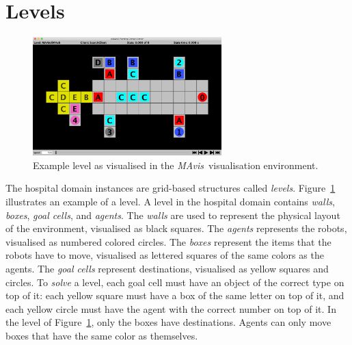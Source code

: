 \documentclass[12pt,a4paper]{article}
\def\mavis{{\itshape MAvis}}
\begin{document}
\section{Levels}\label{sec:env_description}
\begin{figure}
  \begin{center}
    \includegraphics[width=0.65\textwidth]{figures/MAAIoliMAsh}
  \end{center}
  \caption{Example level as visualised in the \mavis\ visualisation environment. }\label{figu:aioli}
\end{figure}
The hospital domain instances are grid-based structures called \emph{levels}. Figure~\ref{figu:aioli} illustrates an example of a level. A level in the hospital domain contains \emph{walls}, \emph{boxes}, \emph{goal cells}, and \emph{agents}. The \emph{walls} are used to represent the physical layout of the environment, visualised as black squares. The \emph{agents} represents the robots, visualised as numbered colored circles. The \emph{boxes} represent the items that the robots have to move, visualised as lettered squares of the same colors as the agents. The \emph{goal cells} represent destinations, visualised as yellow squares and circles. To \emph{solve} a level, each goal cell must have an object of the correct type on top of it: each yellow square must have a box of the same letter on top of it, and each yellow circle must have the agent with the correct number on top of it. In the level of Figure~\ref{figu:aioli}, only the boxes have destinations.  Agents can only move boxes that have the same color as themselves.  
\end{document}
